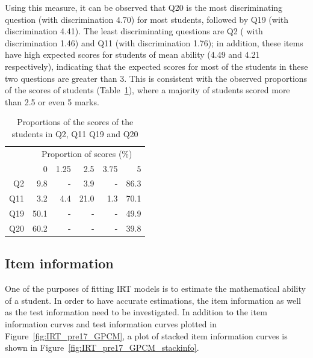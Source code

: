 \documentclass[a4paper]{report}
\begin{document}
Using this measure, it can be observed that Q20 is the most discriminating question (with discrimination 4.70) for most students, followed by Q19 (with discrimination 4.41). The least discriminating questions are Q2 ( with discrimination 1.46) and Q11 (with discrimination 1.76); in addition, these items have high expected scores for students of mean ability (4.49 and 4.21 respectively), indicating that the expected scores for most of the students in these two questions are greater than 3. This is consistent with the observed proportions of the scores of students (Table~\ref{tab:IRT_pre17_scoreprop}), where a majority of students scored more than 2.5 or even 5 marks. 

\begin{table}[ht]
  \centering
  \begin{tabular}{rrrrrr}
    \hline
    & \multicolumn{5}{c}{Proportion of scores (\%)} \\
    \cline{2-6}
   & 0 & 1.25 & 2.5 & 3.75 & 5 \\ 
    \hline
  Q2 & 9.8 & - & 3.9 & - & 86.3 \\ 
    Q11 & 3.2 & 4.4 & 21.0 & 1.3 & 70.1 \\ 
    Q19 & 50.1 & - & - & - & 49.9 \\ 
    Q20 & 60.2 & - & - & - & 39.8 \\ 
     \hline
  \end{tabular}
  \caption{\label{tab:IRT_pre17_scoreprop}Proportions of the scores of the students in Q2, Q11 Q19 and Q20}
\end{table}

\subsection{Item information}

One of the purposes of fitting IRT models is to estimate the mathematical ability of a student. In order to have accurate estimations, the item information as well as the test information need to be investigated. In addition to the item information curves and test information curves plotted in Figure~\ref{fig:IRT_pre17_GPCM}, a plot of stacked item information curves is shown in Figure~\ref{fig:IRT_pre17_GPCM_stackinfo}. 

\end{document}
